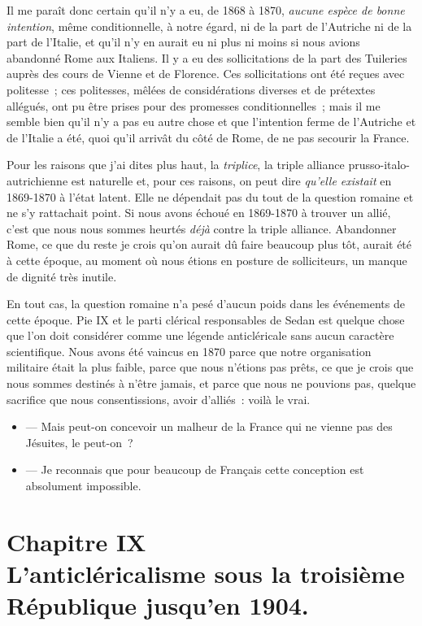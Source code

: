 \documentclass[french,twoside]{book} %
\begin{document}
Il me paraît donc certain qu’il n’y a eu, de 1868 à 1870, {\itshape aucune espèce de bonne intention}, même conditionnelle, à notre égard, ni de la part de l’Autriche ni de la part de l’Italie, et qu’il n’y en aurait eu ni plus ni moins si nous avions abandonné Rome aux Italiens. Il y a eu des sollicitations de la part des Tuileries auprès des cours de Vienne et de Florence. Ces sollicitations ont été reçues avec politesse ; ces politesses, mêlées de considérations diverses et de prétextes allégués, ont pu être prises pour des promesses conditionnelles ; mais il me semble bien qu’il n’y a pas eu autre chose et que l’intention ferme de l’Autriche et de l’Italie a été, quoi qu’il arrivât du côté de Rome, de ne pas secourir la France.\par
Pour les raisons que j’ai dites plus haut, la {\itshape triplice}, la triple alliance prusso-italo-autrichienne est naturelle et, pour ces raisons, on peut dire {\itshape qu’elle  existait} en 1869-1870 à l’état latent. Elle ne dépendait pas du tout de la question romaine et ne s’y rattachait point. Si nous avons échoué en 1869-1870 à trouver un allié, c’est que nous nous sommes heurtés {\itshape déjà} contre la triple alliance. Abandonner Rome, ce que du reste je crois qu’on aurait dû faire beaucoup plus tôt, aurait été à cette époque, au moment où nous étions en posture de solliciteurs, un manque de dignité très inutile.\par
En tout cas, la question romaine n’a pesé d’aucun poids dans les événements de cette époque. Pie IX et le parti clérical responsables de Sedan est quelque chose que l’on doit considérer comme une légende anticléricale sans aucun caractère scientifique. Nous avons été vaincus en 1870 parce que notre organisation militaire était la plus faible, parce que nous n’étions pas prêts, ce que je crois que nous sommes destinés à n’être jamais, et parce que nous ne pouvions pas, quelque sacrifice que nous consentissions, avoir d’alliés : voilà le vrai.\par

\begin{itemize}[itemsep=0pt,]
\item  — Mais peut-on concevoir un malheur de la France qui ne vienne pas des Jésuites, le peut-on ?
\item  — Je reconnais que pour beaucoup de Français cette conception est absolument impossible.
\end{itemize}

 \section[{Chapitre IX. L’anticléricalisme sous la troisième République jusqu’en 1904.}]{Chapitre IX\\
L’anticléricalisme sous la troisième République jusqu’en 1904.}\renewcommand{\leftmark}{Chapitre IX\\
L’anticléricalisme sous la troisième République jusqu’en 1904.}
\end{document}
